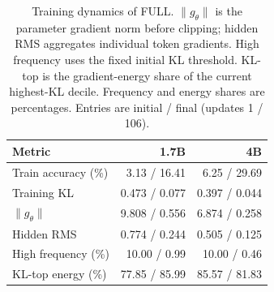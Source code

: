 \begin{table}[t]
\centering
\caption{Training dynamics of FULL. $\|g_\theta\|$ is the parameter gradient norm before clipping; hidden RMS aggregates individual token gradients. High frequency uses the fixed initial KL threshold. KL-top is the gradient-energy share of the current highest-KL decile. Frequency and energy shares are percentages. Entries are initial / final (updates 1 / 106).}
\label{tab:dynamics}
\small
\setlength{\tabcolsep}{3pt}
\begin{tabular}{lrr}
\toprule
Metric & 1.7B & 4B \\
\midrule
Train accuracy (\%) & 3.13 / 16.41 & 6.25 / 29.69 \\
Training KL & 0.473 / 0.077 & 0.397 / 0.044 \\
$\|g_\theta\|$ & 9.808 / 0.556 & 6.874 / 0.258 \\
Hidden RMS & 0.774 / 0.244 & 0.505 / 0.125 \\
High frequency (\%) & 10.00 / 0.99 & 10.00 / 0.46 \\
KL-top energy (\%) & 77.85 / 85.99 & 85.57 / 81.83 \\
\bottomrule
\end{tabular}
\end{table}

